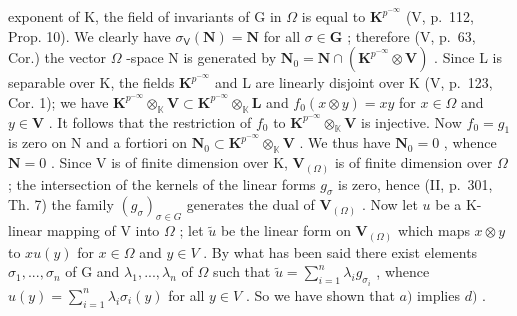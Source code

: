 exponent of K, the field of invariants of G in \(\Omega\) is equal to \(\mathbf{K}^{p^{-\infty}}\) (V, p.~112, Prop. 10). We clearly have \(\sigma_{\mathsf{V}}(\mathbf{N}) = \mathbf{N}\) for all \(\sigma \in \mathbf{G}\) ; therefore (V, p.~63, Cor.) the vector \(\Omega\) -space N is generated by \(\mathbf{N}_0 = \mathbf{N} \cap (\mathbf{K}^{p^{-\infty}} \otimes \mathbf{V})\) . Since L is separable over K, the fields \(\mathbf{K}^{p^{-\infty}}\) and L are linearly disjoint over K (V, p.~123, Cor. 1); we have \(\mathbf{K}^{p^{-\infty}} \otimes_{\mathbb{K}} \mathbf{V} \subset \mathbf{K}^{p^{-\infty}} \otimes_{\mathbb{K}} \mathbf{L}\) and \(f_0(x \otimes y) = xy\) for \(x \in \Omega\) and \(y \in \mathbf{V}\) . It follows that the restriction of \(f_0\) to \(\mathbf{K}^{p^{-\infty}} \otimes_{\mathbb{K}} \mathbf{V}\) is injective. Now \(f_0 = g_1\) is zero on N and a fortiori on \(\mathbf{N}_0 \subset \mathbf{K}^{p^{-\infty}} \otimes_{\mathbb{K}} \mathbf{V}\) . We thus have \(\mathbf{N}_0 = 0\) , whence \(\mathbf{N} = 0\) . Since V is of finite dimension over K, \(\mathbf{V}_{(\Omega)}\) is of finite dimension over \(\Omega\) ; the intersection of the kernels of the linear forms \(g_\sigma\) is zero, hence (II, p.~301, Th. 7) the family \((g_\sigma)_{\sigma \in G}\) generates the dual of \(\mathbf{V}_{(\Omega)}\) . Now let \(u\) be a K-linear mapping of V into \(\Omega\) ; let \(\tilde{u}\) be the linear form on \(\mathbf{V}_{(\Omega)}\) which maps \(x \otimes y\) to \(x u(y)\) for \(x \in \Omega\) and \(y \in V\) . By what has been said there exist elements \(\sigma_1, ..., \sigma_n\) of G and \(\lambda_1, ..., \lambda_n\) of \(\Omega\) such that \(\tilde{u} = \sum_{i=1}^{n} \lambda_i g_{\sigma_i}\) , whence \(u(y) = \sum_{i=1}^{n} \lambda_i \sigma_i(y)\) for all \(y \in V\) . So we have shown that \(a)\) implies \(d)\) .

